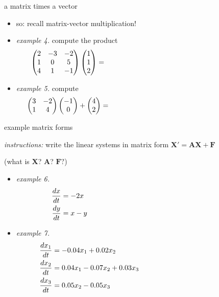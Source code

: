 \documentclass[urlcolor=blue,dvipsnames]{beamer}
\newcommand{\bA}{\mathbf{A}}
\newcommand{\bF}{\mathbf{F}}
\newcommand{\bX}{\mathbf{X}}
\begin{document}
\begin{frame}{a matrix times a vector}

\begin{itemize}
\item so: \alert{recall matrix-vector multiplication!}
\item \emph{example 4.}  compute the product
    $$\begin{pmatrix} 2 & -3 & -2 \\ 1 & 0 & 5 \\ 4 & 1 & -1\end{pmatrix} \begin{pmatrix} 1 \\ 1 \\ 2 \end{pmatrix} = \hspace{70mm}$$

\vspace{15mm}
\item \emph{example 5.}  compute
    $$\begin{pmatrix} 3 & -2 \\ 1 & 4 \end{pmatrix} \begin{pmatrix} -1 \\ 0 \end{pmatrix} +  \begin{pmatrix} 4 \\ 2 \end{pmatrix} = \hspace{70mm}$$
\end{itemize}

\vspace{15mm}
\end{frame}


\begin{frame}{example matrix forms}

\small
\noindent \emph{instructions:} write the linear systems in matrix form $\bX' = \bA\bX + \bF$

(what is $\bX$? $\bA$? $\bF?$)
\begin{itemize}
\item \emph{example 6.}
\begin{align*}
\frac{dx}{dt} &= - 2 x \hspace{70mm} \\
\frac{dy}{dt} &= x - y
\end{align*}
\item \emph{example 7.}
\begin{align*}
\frac{dx_1}{dt} &= -0.04 x_1 + 0.02 x_2 \hspace{60mm} \\
\frac{dx_2}{dt} &= 0.04 x_1 - 0.07 x_2 + 0.03 x_3 \\
\frac{dx_3}{dt} &= 0.05 x_2 - 0.05 x_3
\end{align*}
\end{itemize}
\end{frame}
\end{document}
